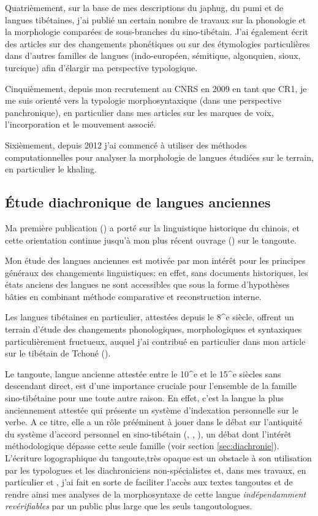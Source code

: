 \documentclass[oldfontcommands,oneside,a4paper,11pt]{article}
\begin{document}
Quatrièmement, sur la base de mes descriptions du japhug, du pumi et de langues tibétaines, j'ai publié un certain nombre de travaux sur la phonologie et la morphologie comparées de sous-branches du sino-tibétain. J'ai également écrit des articles sur des changements phonétiques ou sur des étymologies particulières dans d'autres familles de langues (indo-européen, sémitique, algonquien, sioux, turcique) afin d'élargir ma perspective typologique.

Cinquièmement, depuis mon recrutement au CNRS en 2009 en tant que CR1, je me suis orienté vers la typologie morphosyntaxique (dans une perspective panchronique),  en particulier dans mes articles sur les marques de voix, l'incorporation et le mouvement associé.

Sixièmement, depuis 2012 j'ai commencé à utiliser des méthodes computationnelles pour analyser la morphologie de langues étudiées sur le terrain, en particulier le khaling.

\subsection{Étude diachronique de langues anciennes} \label{sec:philologie}
Ma première publication (\citealt{jacques00ywij}) a porté sur la linguistique historique du chinois, et cette orientation continue jusqu'à mon plus récent ouvrage (\citealt{jacques14esquisse}) sur le tangoute.

Mon étude des langues anciennes est motivée par mon intérêt pour les principes généraux des changements linguistiques: en effet, sans documents historiques, les états anciens des langues ne sont accessibles que sous la forme d'hypothèses bâties en combinant méthode comparative et reconstruction interne. 

Les langues tibétaines en particulier, attestées depuis le 8^e siècle, offrent un terrain d'étude des changements phonologiques, morphologiques et syntaxiques particulièrement fructueux, auquel j'ai contribué en particulier dans mon article sur le tibétain de Tchoné (\citealt{jacques14cone}).

Le tangoute, langue ancienne attestée entre le 10^{e} et le 15^e siècles sans descendant direct, est d'une importance cruciale pour l'ensemble de la famille sino-tibétaine pour une toute autre raison. En effet, c'est la langue la plus anciennement attestée qui présente un système d'indexation personnelle sur le verbe. A ce titre, elle a un rôle prééminent à jouer dans le débat sur l'antiquité du système d'accord personnel en sino-tibétain (\citealt{jacques09tangutverb}, \citealt{jacques10zos}, \citealt{jacques11tangut.verb}), un débat dont l'intérêt méthodologique dépasse cette seule famille (voir section \ref{sec:diachronie}). L'écriture logographique du tangoute,très opaque est un obstacle à son utilisation par les typologues et les diachroniciens non-spécialistes et, dans mes travaux, en particulier \citet{jacques07textes} et \citet{jacques14esquisse}, j'ai fait en sorte de faciliter l'accès aux textes tangoutes et de rendre ainsi mes analyses de la morphosyntaxe de cette langue \textit{indépendamment revérifiables} par un public plus large que les seuls tangoutologues.
\end{document}
